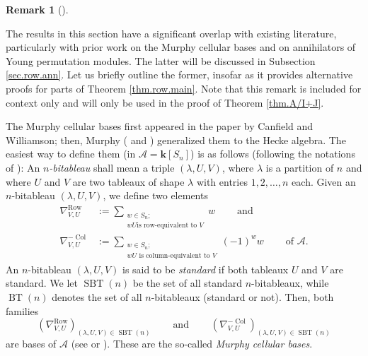 \documentclass[numbers=enddot,12pt,final,onecolumn,notitlepage]{scrartcl}%
\numberwithin{exer}{subsection}
\theoremstyle{definition}
\newtheorem{remk}[theo]{Remark}
\newenvironment{remark}[1][]
{\begin{remk}[#1]\begin{leftbar}}
{\end{leftbar}\end{remk}}
\let\sumnonlimits\sum
\renewcommand{\sum}{\sumnonlimits\limits}
\begin{document}
\begin{remark}
\label{rmk.IJ=murphy}The results in this section have a significant overlap
with existing literature, particularly with prior work on the Murphy cellular
bases and on annihilators of Young permutation modules. The latter will be
discussed in Subsection \ref{sec.row.ann}. Let us briefly outline the former,
insofar as it provides alternative proofs for parts of Theorem
\ref{thm.row.main}. Note that this remark is included for context only and
will only be used in the proof of Theorem \ref{thm.A/I+J}.

The Murphy cellular bases first appeared in the paper \cite{CanWil89} by
Canfield and Williamson; then, Murphy (\cite{Murphy92} and \cite{Murphy95})
generalized them to the Hecke algebra. The easiest way to define them (in
$\mathcal{A}=\mathbf{k}\left[  S_{n}\right]  $) is as follows (following the
notations of \cite[\S 6.8]{sga}): An $n$\emph{-bitableau} shall mean a triple
$\left(  \lambda,U,V\right)  $, where $\lambda$ is a partition of $n$ and
where $U$ and $V$ are two tableaux of shape $\lambda$ with entries
$1,2,\ldots,n$ each. Given an $n$-bitableau $\left(  \lambda,U,V\right)  $, we
define two elements%
\begin{align*}
\nabla_{V,U}^{\operatorname*{Row}}  &  :=\sum_{\substack{w\in S_{n};\\wU\text{
is row-equivalent to }V}}w\ \ \ \ \ \ \ \ \ \ \text{and}\\
\nabla_{V,U}^{-\operatorname*{Col}}  &  :=\sum_{\substack{w\in S_{n}%
;\\wU\text{ is column-equivalent to }V}}\left(  -1\right)  ^{w}%
w\ \ \ \ \ \ \ \ \ \ \text{of }\mathcal{A}.
\end{align*}
An $n$-bitableau $\left(  \lambda,U,V\right)  $ is said to be \emph{standard}
if both tableaux $U$ and $V$ are standard. We let $\operatorname*{SBT}\left(
n\right)  $ be the set of all standard $n$-bitableaux, while
$\operatorname*{BT}\left(  n\right)  $ denotes the set of all $n$-bitableaux
(standard or not). Then, both families%
\[
\left(  \nabla_{V,U}^{\operatorname*{Row}}\right)  _{\left(  \lambda
,U,V\right)  \in\operatorname*{SBT}\left(  n\right)  }%
\ \ \ \ \ \ \ \ \ \ \text{and}\ \ \ \ \ \ \ \ \ \ \left(  \nabla
_{V,U}^{-\operatorname*{Col}}\right)  _{\left(  \lambda,U,V\right)
\in\operatorname*{SBT}\left(  n\right)  }%
\]
are bases of $\mathcal{A}$ (see \cite[Theorems 3.12, 3.14 and 6.13]{CanWil89}
or \cite[Theorem 6.8.14]{sga}). These are the so-called \emph{Murphy cellular
bases}.


\end{remark}
\end{document}
